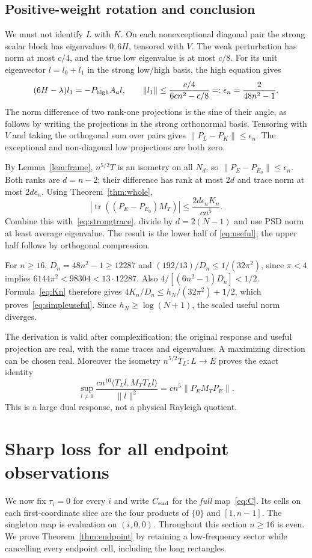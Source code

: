 \documentclass[11pt]{article}
\newcommand{\norm}[1]{\lVert#1\rVert}
\newcommand{\ip}[2]{\langle#1,#2\rangle}
\DeclareMathOperator{\tr}{tr}
\theoremstyle{definition}
\theoremstyle{remark}
\begin{document}
\subsection{Positive-weight rotation and conclusion}
We must not identify $L$ with $K$. On each nonexceptional diagonal pair
the strong scalar block has eigenvalues $0,6H$, tensored with $V$.
The weak perturbation has norm at most $c/4$, and the true low eigenvalue
is at most $c/8$. For its unit eigenvector $l=l_0+l_1$ in the strong
low/high basis, the high equation gives
\[
 (6H-\lambda)l_1=-P_{\rm high}A_al,\qquad
 \norm{l_1}\le\frac{c/4}{6cn^2-c/8}
                     =:\epsilon_n=\frac2{48n^2-1}.
\]
The norm difference of two rank-one projections is the sine of their
angle, as follows by writing the projections in the strong orthonormal
basis. Tensoring with $V$ and taking the orthogonal sum over pairs gives
$\norm{P_L-P_K}\le\epsilon_n$. The exceptional and non-diagonal low
projections are both zero.

By Lemma~\ref{lem:frame}, $n^{5/2}T$ is an isometry on all $N_d$, so
$\norm{P_E-P_{E_0}}\le\epsilon_n$. Both ranks are $d=n-2$; their
difference has rank at most $2d$ and trace norm at most $2d\epsilon_n$.
Using Theorem~\ref{thm:whole},
\[
 |\tr((P_E-P_{E_0})M_T)|\le\frac{2d\epsilon_nK_n}{cn^5}.
\]
Combine this with~\eqref{eq:strongtrace}, divide by $d=2(N-1)$ and use
PSD norm at least average eigenvalue. The result is the lower half of
\eqref{eq:useful}; the upper half follows by orthogonal compression.

For $n\ge16$, $D_n=48n^2-1\ge12287$ and
$(192/13)/D_n\le1/(32\pi^2)$, since $\pi<4$ implies
$6144\pi^2<98304<13\cdot12287$. Also
$4/[(6n^2-1)D_n]<1/2$. Formula~\eqref{eq:Kn} therefore gives
$4K_n/D_n\le h_N/(32\pi^2)+1/2$, which proves~\eqref{eq:simpleuseful}.
Since $h_N\ge\log(N+1)$, the scaled useful norm diverges.

The derivation is valid after complexification; the original response and
useful projection are real, with the same traces and eigenvalues. A
maximizing direction can be chosen real. Moreover the isometry
$n^{5/2}T_L:L\to E$ proves the exact identity
\[
 \sup_{l\ne0}\frac{cn^{10}\ip{T_Ll}{M_TT_Ll}}{\norm l^2}
                   =cn^5\norm{P_EM_TP_E}.
\]
This is a large dual response, not a physical Rayleigh quotient.

\section{Sharp loss for all endpoint observations}\label{sec:endpoint}
We now fix $\tau_i=0$ for every $i$ and write $C_{\rm end}$ for the
\emph{full} map~\eqref{eq:C}. Its cells on each first-coordinate slice are
the four products of $\{0\}$ and $[1,n-1]$. The singleton map is evaluation
on $(i,0,0)$. Throughout this section $n\ge16$ is even. We prove
Theorem~\ref{thm:endpoint} by retaining a low-frequency sector while
cancelling every endpoint cell, including the long rectangles.
\end{document}
